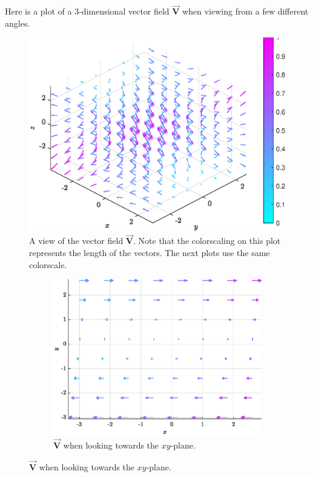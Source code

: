 \documentclass[12pt]{amsbook}
\newcommand{\vecfieldV}{\boldsymbol{\vec{V}}}
\begin{document}
\begin{problem}
Here is a plot of a 3-dimensional vector field $\vecfieldV$ when viewing from a few different angles.
\begin{figure}[H]
    \centering
    \includegraphics[width=.85\textwidth]{figures/vecfield}
    \caption{A view of the vector field $\vecfieldV$. Note that the colorscaling on this plot represents the length of the vectors. The next plots use the same colorscale.}
\end{figure}
\begin{figure}[H]
    \centering
    \begin{subfigure}[b]{0.45\textwidth}
        \centering
        \includegraphics[width=\textwidth]{figures/vecfield_xy}
        \caption{$\vecfieldV$ when looking towards the $xy$-plane.}
    \end{subfigure}

\end{figure}
\end{problem}
\end{document}
